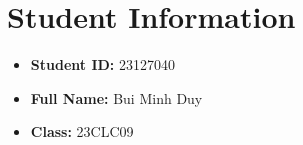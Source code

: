 \section{Student Information}
\begin{itemize}
	\item \textbf{Student ID:} 23127040
	\item \textbf{Full Name:} Bui Minh Duy
	\item \textbf{Class:} 23CLC09
\end{itemize}